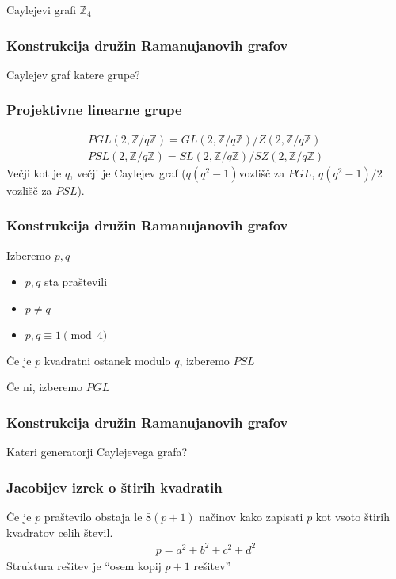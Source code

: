 \documentclass{beamer}
\begin{document}
\begin{frame}{Caylejevi grafi \(\mathbb Z_4\)}
\end{frame}
\begin{frame}
    \frametitle{Konstrukcija družin Ramanujanovih grafov}
    Caylejev graf katere grupe?
\end{frame}
\begin{frame}
    \frametitle{Projektivne linearne grupe}
    \begin{align*}
        PGL(2, \mathbb Z / q\mathbb Z) = GL(2, \mathbb Z / q\mathbb Z) / Z(2, \mathbb Z / q\mathbb Z) \\
        PSL(2, \mathbb Z / q\mathbb Z) = SL(2, \mathbb Z / q\mathbb Z) / SZ(2, \mathbb Z / q\mathbb Z)
    \end{align*}
    Večji kot je \(q\), večji je Caylejev graf (\(q(q^2-1)\)vozlišč za \(PGL\), \(q(q^2-1)/2\) vozlišč za \(PSL\)).
\end{frame}
\begin{frame}
    \frametitle{Konstrukcija družin Ramanujanovih grafov}
    Izberemo \(p,q\)
    \begin{itemize}
        \item \(p,q\) sta praštevili
        \item \(p\neq q\)
        \item \(p,q \equiv 1\pmod 4\)
    \end{itemize}
    Če je \(p\) kvadratni ostanek modulo \(q\), izberemo \(PSL\)

    Če ni, izberemo \(PGL\)
\end{frame}
\begin{frame}
    \frametitle{Konstrukcija družin Ramanujanovih grafov}
    Kateri generatorji Caylejevega grafa?
\end{frame}
\begin{frame}
    \frametitle{Jacobijev izrek o štirih kvadratih}
    Če je \(p\) praštevilo obstaja le \(8(p+1)\) načinov kako zapisati \(p\) kot vsoto štirih kvadratov celih števil.
    \begin{align*}
        p = a^2 + b^2 + c^2 + d^2
    \end{align*}\pause
    Struktura rešitev je ``osem kopij \(p+1\) rešitev''
\end{frame}
\end{document}
